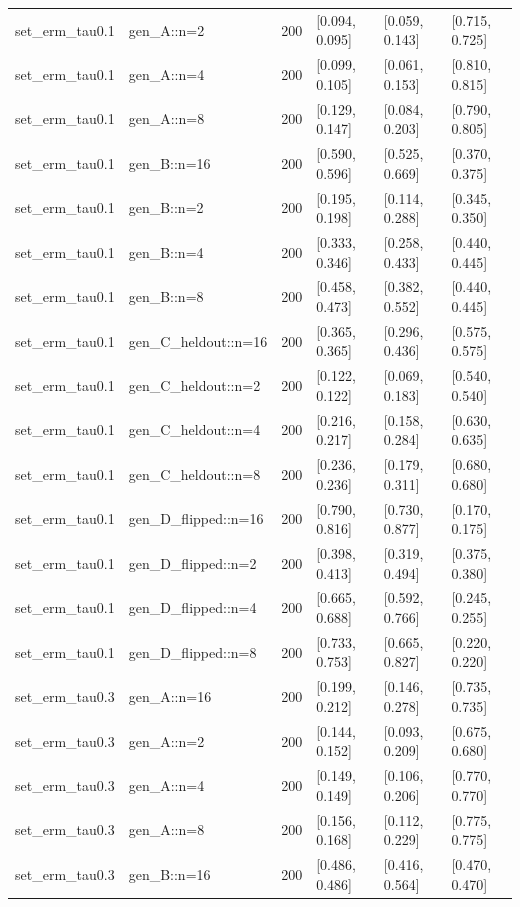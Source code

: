 \begin{tabular}{llrlll}
set\_erm\_tau0.1 & gen\_A::n=2 & 200 & [0.094, 0.095] & [0.059, 0.143] & [0.715, 0.725] \\
set\_erm\_tau0.1 & gen\_A::n=4 & 200 & [0.099, 0.105] & [0.061, 0.153] & [0.810, 0.815] \\
set\_erm\_tau0.1 & gen\_A::n=8 & 200 & [0.129, 0.147] & [0.084, 0.203] & [0.790, 0.805] \\
set\_erm\_tau0.1 & gen\_B::n=16 & 200 & [0.590, 0.596] & [0.525, 0.669] & [0.370, 0.375] \\
set\_erm\_tau0.1 & gen\_B::n=2 & 200 & [0.195, 0.198] & [0.114, 0.288] & [0.345, 0.350] \\
set\_erm\_tau0.1 & gen\_B::n=4 & 200 & [0.333, 0.346] & [0.258, 0.433] & [0.440, 0.445] \\
set\_erm\_tau0.1 & gen\_B::n=8 & 200 & [0.458, 0.473] & [0.382, 0.552] & [0.440, 0.445] \\
set\_erm\_tau0.1 & gen\_C\_heldout::n=16 & 200 & [0.365, 0.365] & [0.296, 0.436] & [0.575, 0.575] \\
set\_erm\_tau0.1 & gen\_C\_heldout::n=2 & 200 & [0.122, 0.122] & [0.069, 0.183] & [0.540, 0.540] \\
set\_erm\_tau0.1 & gen\_C\_heldout::n=4 & 200 & [0.216, 0.217] & [0.158, 0.284] & [0.630, 0.635] \\
set\_erm\_tau0.1 & gen\_C\_heldout::n=8 & 200 & [0.236, 0.236] & [0.179, 0.311] & [0.680, 0.680] \\
set\_erm\_tau0.1 & gen\_D\_flipped::n=16 & 200 & [0.790, 0.816] & [0.730, 0.877] & [0.170, 0.175] \\
set\_erm\_tau0.1 & gen\_D\_flipped::n=2 & 200 & [0.398, 0.413] & [0.319, 0.494] & [0.375, 0.380] \\
set\_erm\_tau0.1 & gen\_D\_flipped::n=4 & 200 & [0.665, 0.688] & [0.592, 0.766] & [0.245, 0.255] \\
set\_erm\_tau0.1 & gen\_D\_flipped::n=8 & 200 & [0.733, 0.753] & [0.665, 0.827] & [0.220, 0.220] \\
set\_erm\_tau0.3 & gen\_A::n=16 & 200 & [0.199, 0.212] & [0.146, 0.278] & [0.735, 0.735] \\
set\_erm\_tau0.3 & gen\_A::n=2 & 200 & [0.144, 0.152] & [0.093, 0.209] & [0.675, 0.680] \\
set\_erm\_tau0.3 & gen\_A::n=4 & 200 & [0.149, 0.149] & [0.106, 0.206] & [0.770, 0.770] \\
set\_erm\_tau0.3 & gen\_A::n=8 & 200 & [0.156, 0.168] & [0.112, 0.229] & [0.775, 0.775] \\
set\_erm\_tau0.3 & gen\_B::n=16 & 200 & [0.486, 0.486] & [0.416, 0.564] & [0.470, 0.470] \\

\end{tabular}
